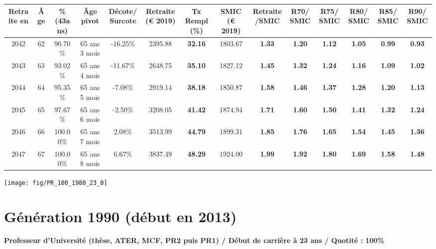 \begin{adjustbox}{max width=\textwidth} 
\begin{tabular}[htb]{|c|c||c|c|c||c|c||c|c||c|c|c|c|c|} 
\hline 
 Retraite en &  Âge &  \%(43ans) &  Âge pivot &  Décote/Surcote &  Retraite (\euro{} 2019) &  Tx Rempl(\%) &  SMIC (\euro{} 2019) &  Retraite/SMIC &  R70/SMIC &  R75/SMIC &  R80/SMIC &  R85/SMIC &  R90/SMIC \\ 
\hline \hline 
 2042 &  62 &  90.70\% &  65 ans 3 mois &  -16.25\% &  2395.88 &  {\bf 32.16} &  1803.67 &  {\bf 1.33} &  {\bf 1.20} &  {\bf 1.12} &  {\bf 1.05} &  {\bf {\color{red} 0.99}} &  {\bf {\color{red} 0.93}} \\ 
\hline 
 2043 &  63 &  93.02\% &  65 ans 4 mois &  -11.67\% &  2648.75 &  {\bf 35.10} &  1827.12 &  {\bf 1.45} &  {\bf 1.32} &  {\bf 1.24} &  {\bf 1.16} &  {\bf 1.09} &  {\bf 1.02} \\ 
\hline 
 2044 &  64 &  95.35\% &  65 ans 5 mois &  -7.08\% &  2919.14 &  {\bf 38.18} &  1850.87 &  {\bf 1.58} &  {\bf 1.46} &  {\bf 1.37} &  {\bf 1.28} &  {\bf 1.20} &  {\bf 1.13} \\ 
\hline 
 2045 &  65 &  97.67\% &  65 ans 6 mois &  -2.50\% &  3208.05 &  {\bf 41.42} &  1874.94 &  {\bf 1.71} &  {\bf 1.60} &  {\bf 1.50} &  {\bf 1.41} &  {\bf 1.32} &  {\bf 1.24} \\ 
\hline 
 2046 &  66 &  100.00\% &  65 ans 7 mois &  2.08\% &  3513.99 &  {\bf 44.79} &  1899.31 &  {\bf 1.85} &  {\bf 1.76} &  {\bf 1.65} &  {\bf 1.54} &  {\bf 1.45} &  {\bf 1.36} \\ 
\hline 
 2047 &  67 &  100.00\% &  65 ans 8 mois &  6.67\% &  3837.49 &  {\bf 48.29} &  1924.00 &  {\bf 1.99} &  {\bf 1.92} &  {\bf 1.80} &  {\bf 1.69} &  {\bf 1.58} &  {\bf 1.48} \\ 
\hline 
\hline 
\end{tabular} 
\end{adjustbox} 
 
 \vspace{0.1cm} 

 {\hspace{-2.2cm}\texttt{[image: fig/PR\_100\_1980\_23\_0]}} 

\newpage 
 
\section{Génération 1990 (début en 2013)\label{PR_100_1990_23_0}} 
 
{\bf \noindent Professeur d'Université (thèse, ATER, MCF, PR2 puis PR1) / Début de carrière à 23 ans / Quotité : 100\%}  ~ 

